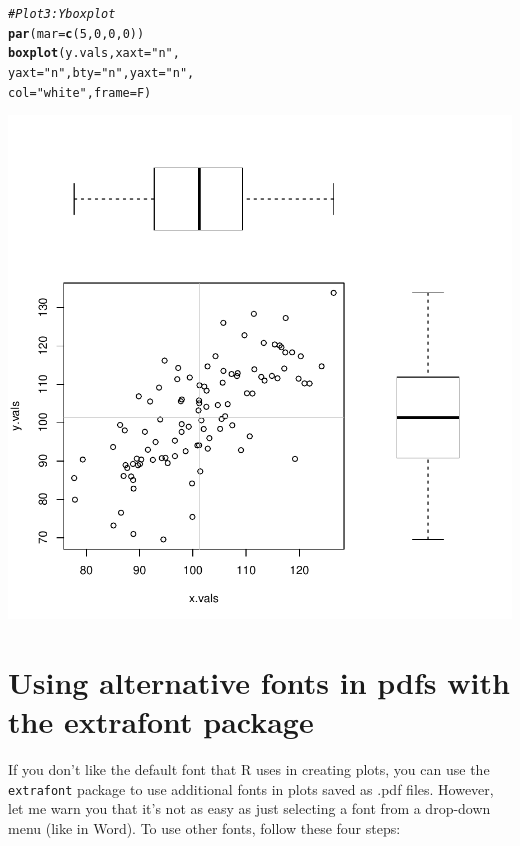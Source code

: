 \documentclass{tufte-book}\usepackage[]{graphicx}\usepackage[]{color}
\makeatletter
\def\maxwidth{ %
  \ifdim\Gin@nat@width>\linewidth
    \linewidth
  \else
    \Gin@nat@width
  \fi
}
\newcommand{\hlnum}[1]{\textcolor[rgb]{0.686,0.059,0.569}{#1}}%
\newcommand{\hlstr}[1]{\textcolor[rgb]{0.192,0.494,0.8}{#1}}%
\newcommand{\hlcom}[1]{\textcolor[rgb]{0.678,0.584,0.686}{\textit{#1}}}%
\newcommand{\hlstd}[1]{\textcolor[rgb]{0.345,0.345,0.345}{#1}}%
\newcommand{\hlkwc}[1]{\textcolor[rgb]{0.333,0.667,0.333}{#1}}%
\newcommand{\hlkwd}[1]{\textcolor[rgb]{0.737,0.353,0.396}{\textbf{#1}}}%
\newenvironment{kframe}{%
 \def\at@end@of@kframe{}%
 \ifinner\ifhmode%
  \def\at@end@of@kframe{\end{minipage}}%
  \begin{minipage}{\columnwidth}%
 \fi\fi%
 \def\FrameCommand##1{\hskip\@totalleftmargin \hskip-\fboxsep
 \colorbox{shadecolor}{##1}\hskip-\fboxsep
     \hskip-\linewidth \hskip-\@totalleftmargin \hskip\columnwidth}%
 \MakeFramed {\advance\hsize-\width
   \@totalleftmargin\z@ \linewidth\hsize
   \@setminipage}}%
 {\par\unskip\endMakeFramed%
 \at@end@of@kframe}
\newenvironment{knitrout}{}{} %
\makeatother
\begin{document}
\begin{footnotesize}
\begin{footnotesize}
\begin{knitrout}
\begin{kframe}
\begin{alltt}
\hlcom{# Plot 3: Y boxplot}
\hlkwd{par}\hlstd{(}\hlkwc{mar} \hlstd{=} \hlkwd{c}\hlstd{(}\hlnum{5}\hlstd{,} \hlnum{0}\hlstd{,} \hlnum{0}\hlstd{,} \hlnum{0}\hlstd{))}
\hlkwd{boxplot}\hlstd{(y.vals,} \hlkwc{xaxt} \hlstd{=} \hlstr{"n"}\hlstd{,}
        \hlkwc{yaxt} \hlstd{=} \hlstr{"n"}\hlstd{,} \hlkwc{bty} \hlstd{=} \hlstr{"n"}\hlstd{,} \hlkwc{yaxt} \hlstd{=} \hlstr{"n"}\hlstd{,}
        \hlkwc{col} \hlstd{=} \hlstr{"white"}\hlstd{,} \hlkwc{frame} \hlstd{= F)}
\end{alltt}
\end{kframe}
\includegraphics[width=\maxwidth]{figure/unnamed-chunk-182-1} 

\end{knitrout}
\end{footnotesize}


\section{Using alternative fonts in pdfs with the extrafont package}

If you don't like the default font that R uses in creating plots, you can use the \texttt{extrafont} package to use additional fonts in plots saved as .pdf files. However, let me warn you that it's not as easy as just selecting a font from a drop-down menu (like in Word). To use other fonts, follow these four steps:


\end{footnotesize}
\end{document}
